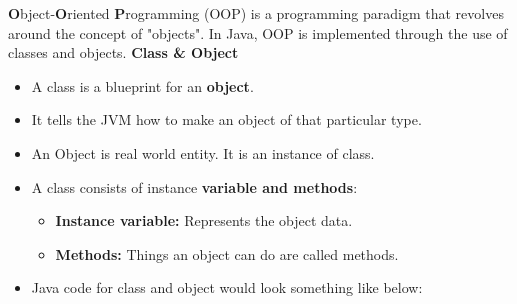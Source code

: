 

\begin{flushleft}
	
	\textbf{O}bject-\textbf{O}riented \textbf{P}rogramming (OOP) is a programming paradigm that revolves around the concept of "objects". 
	\newline
	\newline
	In Java, OOP is implemented through the use of classes and objects.
	\newline \newline
	\textbf{Class \& Object}	
	\begin{itemize}
		\item A class is a blueprint for an \textbf{object}. 
		\item It tells the JVM how to make an object of that particular type.
		\item An Object is real world entity. It is an instance of class.
		
		
		\item A class consists of instance \textbf{variable and methods}:
		\begin{itemize}
			\item \textbf{Instance variable:} Represents the object data.
			\item \textbf{Methods:} Things an object can do are called methods.
		\end{itemize}
		
		\newpage
		\item Java code for class and object would look something like below:
		
		
		
	\end{itemize}
	
\end{flushleft}
